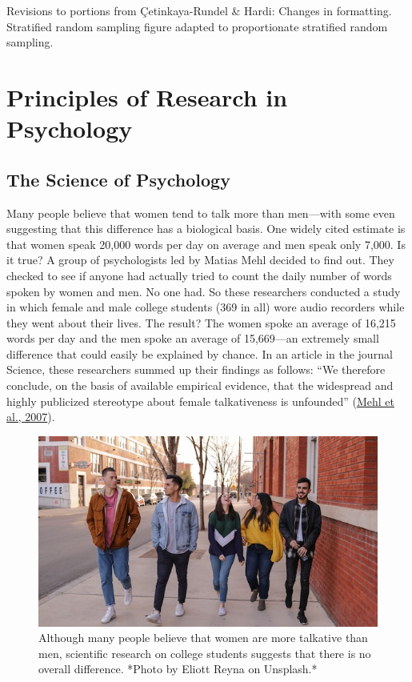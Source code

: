 \documentclass[
]{krantz}
\begin{document}
Revisions to portions from Çetinkaya-Rundel \& Hardi: Changes in formatting. Stratified random sampling figure adapted to proportionate stratified random sampling.

\hypertarget{part-principles-of-research-in-psychology}{%
\part*{Principles of Research in Psychology}\label{part-principles-of-research-in-psychology}}


\hypertarget{the-science-of-psychology}{%
\chapter{The Science of Psychology}\label{the-science-of-psychology}}

Many people believe that women tend to talk more than men---with some even suggesting that this difference has a biological basis. One widely cited estimate is that women speak 20,000 words per day on average and men speak only 7,000. Is it true? A group of psychologists led by Matias Mehl decided to find out. They checked to see if anyone had actually tried to count the daily number of words spoken by women and men. No one had. So these researchers conducted a study in which female and male college students (369 in all) wore audio recorders while they went about their lives. The result? The women spoke an average of 16,215 words per day and the men spoke an average of 15,669---an extremely small difference that could easily be explained by chance. In an article in the journal Science, these researchers summed up their findings as follows: ``We therefore conclude, on the basis of available empirical evidence, that the widespread and highly publicized stereotype about female talkativeness is unfounded'' (\protect\hyperlink{ref-mehl2007women}{Mehl et al., 2007}).

\begin{figure}

{\centering \includegraphics[width=0.7\linewidth]{images/science-of-psych/mehl} 

}

\caption{Although many people believe that women are more talkative than men, scientific research on college students suggests that there is no overall difference. *Photo by Eliott Reyna on Unsplash.*}\label{fig:mehl}
\end{figure}
\end{document}
